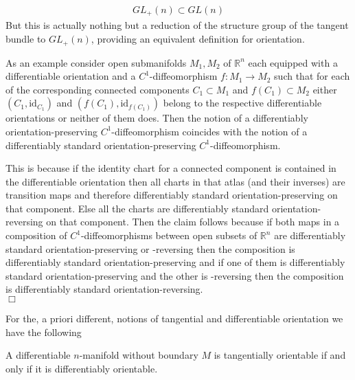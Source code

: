 \begin{align*}
  GL_{+}(n)
  \subset
  GL(n)
\end{align*}
But this is actually nothing but a reduction of the structure group of the tangent bundle to $GL_{+}(n)$, providing an equivalent definition for orientation.
\\
\begin{exa}
\label{exa:difforstdpr}
As an example consider open submanifolds $M_{1},M_{2}$ of $\mathbb{R}^{n}$ each equipped with a differentiable orientation and a $C^{1}$-diffeomorphism $f \colon M_{1} \to M_{2}$ such that for each of the corresponding connected components $C_{1} \subset M_{1}$ and $f(C_{1}) \subset M_{2}$ either $(C_{1},\mathrm{id}_{C_{1}})$ and $(f(C_{1}),\mathrm{id}_{f(C_{1})})$ belong to the respective differentiable orientations or neither of them does. Then the notion of a differentiably orientation-preserving $C^{1}$-diffeomorphism coincides with the notion of a differentiably standard orientation-preserving $C^{1}$-diffeomorphism.
\end{exa}
\begin{prf}[Sketch]
This is because if the identity chart for a connected component is contained in the differentiable orientation then all charts in that atlas (and their inverses) are transition maps and therefore differentiably standard orientation-preserving on that component. Else all the charts are differentiably standard orientation-reversing on that component. Then the claim follows because if both maps in a composition of $C^{1}$-diffeomorphisms between open subsets of $\mathbb{R}^{n}$ are differentiably standard orientation-preserving or -reversing then the composition is differentiably standard orientation-preserving and if one of them is differentiably standard orientation-preserving and the other is -reversing then the composition is differentiably standard orientation-reversing.
\\
\phantom{proven}
\hfill
$\Box$
\end{prf}
For the, a priori different, notions of tangential and differentiable orientation we have the following
\\
\begin{thm}
\label{thm:equivtangdiff}
A differentiable $n$-manifold without boundary $M$ is tangentially orientable if and only if it is differentiably orientable.
\end{thm}
